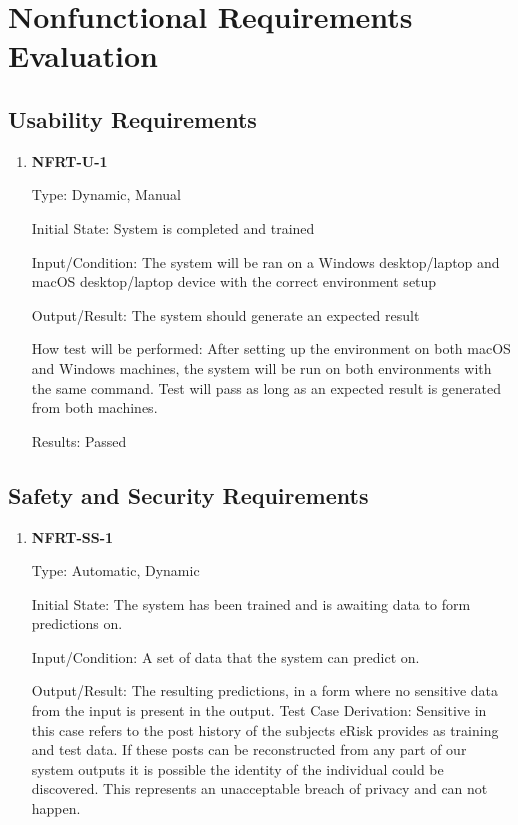 \documentclass[12pt, titlepage]{article}
\begin{document}
\begin{enumerate}
\begin{enumerate}
\end{enumerate}


\section{Nonfunctional Requirements Evaluation}


\subsection{Usability Requirements}


\begin{enumerate}


\item \textbf{NFRT-U-1}
  
Type: Dynamic, Manual
            
Initial State: System is completed and trained
            
Input/Condition: The system will be ran on a Windows desktop/laptop and macOS desktop/laptop device with the correct environment setup
            
Output/Result: The system should generate an expected result
            
How test will be performed: After setting up the environment on both macOS and Windows machines, the system will be run on both environments with the same command. Test will pass as long as an expected result is generated from both machines.


Results: Passed
  
\end{enumerate}
  
\subsection{Safety and Security Requirements}


\begin{enumerate}


\item \textbf{NFRT-SS-1}
	
Type: Automatic, Dynamic
						
Initial State: The system has been trained and is awaiting data to form predictions on.
          
Input/Condition: A set of data that the system can predict on.
          
Output/Result: The resulting predictions, in a form where no sensitive data from the input is present in the output.
 Test Case Derivation: Sensitive in this case refers to the post history of the subjects eRisk provides as training and test data. If these posts can be reconstructed from any part of our system outputs it is possible the identity of the individual could be discovered. This represents an unacceptable breach of privacy and can not happen.
          

\end{enumerate}
\end{enumerate}
\end{document}
